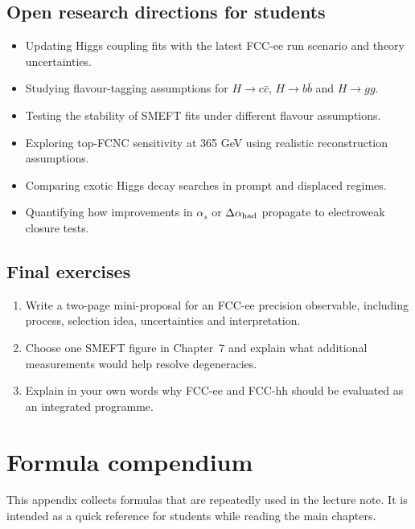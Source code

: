 \documentclass[11pt,a4paper]{article}
\numberwithin{equation}{section}
\begin{document}
\subsection{Open research directions for students}
\begin{itemize}[leftmargin=1.6em]
\item Updating Higgs coupling fits with the latest FCC-ee run scenario and theory uncertainties.
\item Studying flavour-tagging assumptions for \(H\to c\bar c\), \(H\to b\bar b\) and \(H\to gg\).
\item Testing the stability of SMEFT fits under different flavour assumptions.
\item Exploring top-FCNC sensitivity at 365 GeV using realistic reconstruction assumptions.
\item Comparing exotic Higgs decay searches in prompt and displaced regimes.
\item Quantifying how improvements in \(\alpha_s\) or \(\Delta\alpha_{\rm had}\) propagate to electroweak closure tests.
\end{itemize}

\subsection{Final exercises}
\begin{enumerate}[leftmargin=1.6em]
\item Write a two-page mini-proposal for an FCC-ee precision observable, including process, selection idea, uncertainties and interpretation.
\item Choose one SMEFT figure in Chapter~7 and explain what additional measurements would help resolve degeneracies.
\item Explain in your own words why FCC-ee and FCC-hh should be evaluated as an integrated programme.
\end{enumerate}

\newpage
\appendix
\section{Formula compendium}
\begin{guidelinebox}
This appendix collects formulas that are repeatedly used in the lecture note. It is intended as a quick reference for students while reading the main chapters.
\end{guidelinebox}
\end{document}
